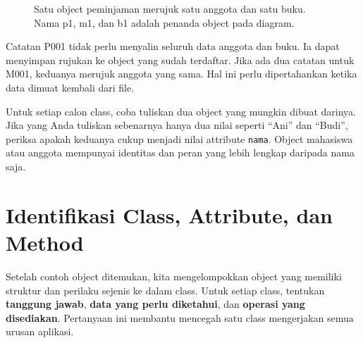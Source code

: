 \begin{figure}[htbp]
\centering
{}
\caption{Satu object peminjaman merujuk satu anggota dan satu buku. Nama p1, m1, dan b1 adalah penanda object pada diagram.}
\label{fig:b11-object}
\end{figure}

Catatan P001 tidak perlu menyalin seluruh data anggota dan buku. Ia dapat menyimpan rujukan ke object yang sudah terdaftar. Jika ada dua catatan untuk M001, keduanya merujuk anggota yang sama. Hal ini perlu dipertahankan ketika data dimuat kembali dari file.

\begin{tips}
Untuk setiap calon class, coba tuliskan dua object yang mungkin dibuat darinya. Jika yang Anda tuliskan sebenarnya hanya dua nilai seperti ``Ani'' dan ``Budi'', periksa apakah keduanya cukup menjadi nilai attribute \texttt{nama}. Object mahasiswa atau anggota mempunyai identitas dan peran yang lebih lengkap daripada nama saja.
\end{tips}

\section{Identifikasi Class, Attribute, dan Method}

Setelah contoh object ditemukan, kita mengelompokkan object yang memiliki struktur dan perilaku sejenis ke dalam class. Untuk setiap class, tentukan \textbf{tanggung jawab}, \textbf{data yang perlu diketahui}, dan \textbf{operasi yang disediakan}. Pertanyaan ini membantu mencegah satu class mengerjakan semua urusan aplikasi.

